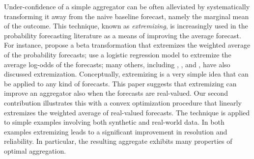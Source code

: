 \documentclass[11pt]{article}
\theoremstyle{definition}
\theoremstyle{definition}
\begin{document}
Under-confidence of a simple aggregator can be often alleviated by systematically transforming it away from the naive baseline forecast, namely the marginal mean of the outcome. 
This technique, known as \textit{extremizing}, is increasingly used in the probability forecasting literature as a means of
improving the average forecast. For instance, \cite{Ranjan08} propose a beta transformation that extremizes the weighted average of
  the probability forecasts; \cite{satopaa} use a logistic regression model to extremize the average log-odds of the
  forecasts; many others, including \cite{baron2014two}, \cite{mellers2014psychological}, and \cite{shlomi2010subjective}, have also discussed extremization. 
Conceptually, extremizing is a very simple idea that can be applied to any kind of forecasts.
 This paper suggests that extremizing can improve an aggregator also when the forecasts are real-valued. 
Our second contribution illustrates this with a convex optimization procedure that linearly extremizes the weighted average of real-valued forecasts. The technique is applied to simple examples involving both synthetic and real-world data. In both examples extremizing leads to a significant improvement in resolution and reliability. In particular, the resulting aggregate exhibits many properties of optimal aggregation.

\end{document}
